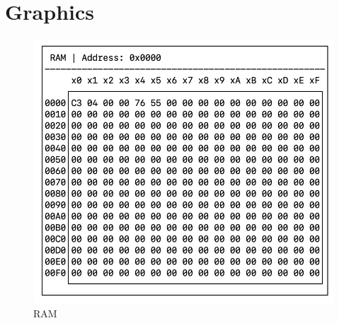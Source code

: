 \documentclass[12pt]{article}
\begin{document}
\section{Graphics}

\begin{figure}
    \centering
    \includegraphics[scale=1]{ram.png}
    \caption{RAM}
    \label{fig:ram}
\end{figure}

\end{document}
